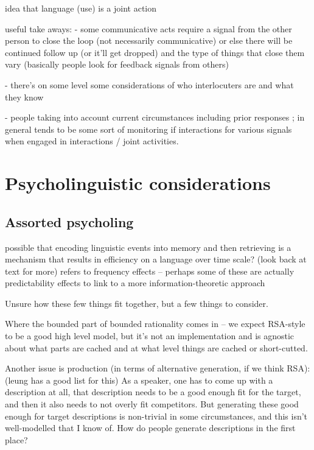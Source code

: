 \documentclass[]{article}
\begin{document}
\cite{clark1996} idea that language (use) is a joint action

\cite{clark1996} useful take aways: - some communicative acts require a signal from the other person to close the loop (not necessarily communicative) or else there will be continued follow up (or it’ll get dropped) and the type of things that close them vary (basically people look for feedback signals from others)

- there’s on some level some considerations of who interlocuters are and what they know

- people taking into account current circumstances including prior responses ; in general tends to be some sort of monitoring if interactions for various signals when engaged in interactions / joint activities.






\section{Psycholinguistic considerations}

\subsection{Assorted psycholing}
\cite{bybee2006} possible that encoding linguistic events into memory and then retrieving is a mechanism that results in efficiency on a language over time scale? (look back at text for more) 
refers to frequency effects -- perhaps some of these are actually predictability effects to link to a more information-theoretic approach 

Unsure how these few things fit together, but a few things to consider.

Where the bounded part of bounded rationality comes in -- we expect RSA-style to be a good high level model, but it's not an implementation and is agnostic about what parts are cached and at what level things are cached or short-cutted. 

Another issue is production (in terms of alternative generation, if we think RSA): (leung has a good list for this) As a speaker, one has to come up with a description at all, that description needs to be a good enough fit for the target, and then it also needs to not overly fit competitors. But generating these good enough for target descriptions is non-trivial in some circumstances, and this isn't well-modelled that I know of. How do people generate descriptions in the first place? 
\end{document}
